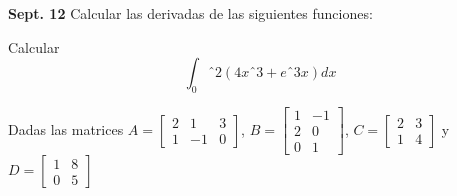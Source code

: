 \documentclass[addpoints,spanish, 12pt,a4paper]{exam}
\begin{document}
\begin{questions}

\question \textbf{Sept. 12} Calcular las derivadas de las siguientes funciones: 

\question[2] Calcular $$\int_0ˆ2 (4xˆ3+eˆ{3x}) dx$$



\question Dadas las matrices  $A=\left[\begin{matrix}2 & 1 & 3\\1 & -1 & 0\end{matrix}\right]$,  $B=\left[\begin{matrix}1 & -1\\2 & 0\\0 & 1\end{matrix}\right]$, $C=\left[\begin{matrix}2 & 3\\1 & 4\end{matrix}\right]$ y $D=\left[\begin{matrix}1 & 8\\0 & 5\end{matrix}\right]$ 

\begin{parts}

\end{parts}
\end{questions}
\end{document}
